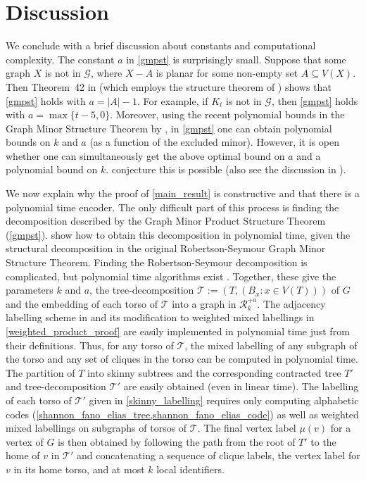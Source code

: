 \documentclass{patmorin}
\begin{document}
\section{Discussion}\label{conclusion}

We conclude with a brief discussion about constants and computational complexity.  The constant $a$ in \cref{gmpst} is surprisingly small. Suppose that some graph $X$ is not in $\mathcal{G}$, where $X-A$ is planar for some non-empty set $A\subseteq V(X)$. Then Theorem~42 in \citep{dujmovic.joret.ea:planar} (which employs the structure theorem of \citet{DvoTho}) shows that \cref{gmpst} holds with $a=|A|-1$. For example, if $K_t$ is not in $\mathcal{G}$, then \cref{gmpst} holds with $a=\max\{t-5,0\}$. Moreover, using the recent polynomial bounds in the Graph Minor Structure Theorem by \citet{gorsky2025polynomial}, in \cref{gmpst} one can obtain polynomial bounds on $k$ and $a$ (as a function of the excluded minor). However, it is open whether one can simultaneously get the above optimal bound on $a$ and a polynomial bound on $k$. \citet[Conjecture~18.9]{gorsky2025polynomial} conjecture this is possible (also see the discussion in \citep{GSW26}).

We now explain why the proof of \cref{main_result} is constructive and that there is a polynomial time encoder.  The only difficult part of this process is finding the decomposition described by the Graph Minor Product Structure Theorem (\cref{gmpst}).  \citet{dujmovic.joret.ea:planar} show how to obtain this decomposition in polynomial time, given the structural decomposition in the original Robertson-Seymour Graph Minor Structure Theorem. Finding the Robertson-Seymour decomposition is complicated, but polynomial time algorithms exist \cite{kawarabayashi2018flat,kawarabayashi2020new,gorsky2025polynomial,demaine2005algorithmic}.  Together, these give the parameters $k$ and $a$, the tree-decomposition $\mathcal{T}:=(T, (B_x:x\in V(T)))$ of $G$ and the embedding of each torso of $\mathcal{T}$ into a graph in $\mathcal{R}_k^{+a}$. The adjacency labelling scheme in \cite{dujmovic.esperet.ea:adjacency} and its modification to weighted mixed labellings in \cref{weighted_product_proof} are easily implemented in polynomial time just from their definitions.  Thus, for any torso of $\mathcal{T}$, the mixed labelling of any subgraph of the torso and any set of cliques in the torso can be computed in polynomial time.  The partition of $T$ into skinny subtrees and the corresponding contracted tree $T'$ and tree-decomposition $\mathcal{T}'$ are easily obtained (even in linear time).  The labelling of each torso of $\mathcal{T}'$ given in \cref{skinny_labelling} requires only computing  alphabetic codes (\cref{shannon_fano_elias_tree,shannon_fano_elias_code}) as well as weighted mixed labellings on subgraphs of torsos of $\mathcal{T}$.  The final vertex label $\mu(v)$ for a vertex of $G$ is then obtained by following the path from the root of $T'$ to the home of $v$ in $\mathcal{T}'$ and concatenating a sequence of clique labels, the vertex label for $v$ in its home torso, and at most $k$ local identifiers.
\end{document}
